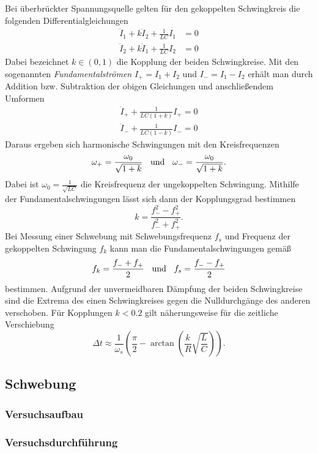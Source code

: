 \documentclass[a4paper, 12pt]{scrartcl}
\begin{document}
Bei überbrückter Spannungsquelle gelten für den gekoppelten Schwingkreis die folgenden Differentialgleichungen 
\begin{align*}
\ddot I_1 + k \ddot I_2 + \frac{1}{LC}I_1 &= 0 \\
\ddot I_2 + k \ddot I_1 + \frac{1}{LC}I_2 &= 0
\end{align*}
Dabei bezeichnet $k \in (0,1)$ die Kopplung der beiden Schwingkreise. 
Mit den sogenannten \textit{Fundamentalströmen} $I_+ = I_1 + I_2$ und $I_- = I_1 - I_2$ erhält man durch Addition bzw. Subtraktion der obigen Gleichungen und anschließendem Umformen
\begin{align*}
\ddot I_+ + \frac{1}{LC(1+k)} I_+ = 0 \\
\ddot I_- + \frac{1}{LC(1-k)} I_- = 0
\end{align*}
Daraus ergeben sich harmonische Schwingungen mit den Kreisfrequenzen 
$$\omega_+ = \frac{\omega_0}{\sqrt{1+k}} \hspace{0.2cm} \text{ und } \hspace{0.2cm} \omega_- = \frac{\omega_0}{\sqrt{1+k}}.$$
Dabei ist $\omega_0 = \frac{1}{\sqrt{LC}}$ die Kreisfrequenz der ungekoppelten Schwingung. Mithilfe der Fundamentalschwingungen lässt sich dann der Kopplungsgrad bestimmen
$$k = \frac{f_-^2 - f_+^2}{f_-^2 + f_+^2}.$$
Bei Messung einer Schwebung mit Schwebungsfrequenz $f_s$ und Frequenz der gekoppelten Schwingung $f_k$ kann man die Fundamentalschwingungen gemäß
$$f_k = \frac{f_- + f_+}{2} \hspace{0.2cm} \text{ und } \hspace{0.2cm} f_s = \frac{f_- - f_+}{2}$$
bestimmen. Aufgrund der unvermeidbaren Dämpfung der beiden Schwingkreise sind die Extrema des einen Schwingkreises gegen die Nulldurchgänge des anderen verschoben. Für Kopplungen $k < 0.2$ gilt näherungsweise für die zeitliche Verschiebung
$$\Delta t \approx \frac{1}{\omega_s} \left( \frac{\pi}{2} - \arctan\left(  \frac kR \sqrt{\frac LC}\right) \right).$$

\subsection{Schwebung}

\subsubsection{Versuchsaufbau}

\subsubsection{Versuchsdurchführung}
\end{document}
